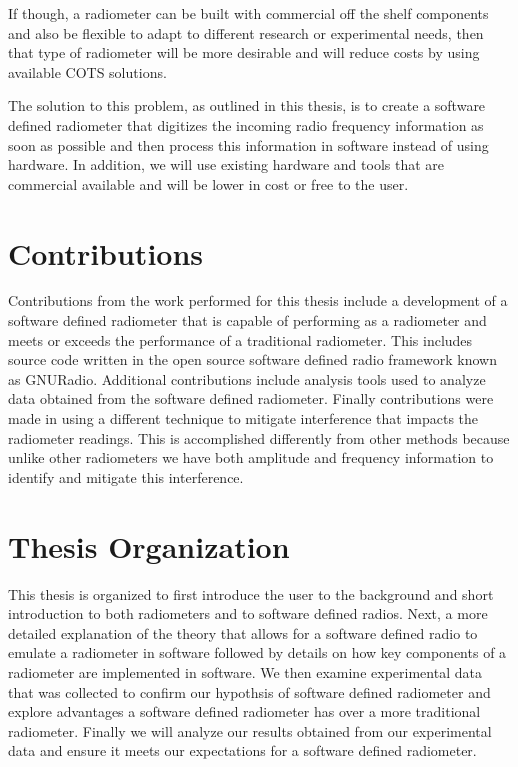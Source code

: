 If though, a radiometer can be built with commercial off the shelf components and also be flexible to adapt to different research or experimental needs, then that type of radiometer will be more desirable and will reduce costs by using available COTS solutions.  

The solution to this problem, as outlined in this thesis, is to create a software defined radiometer that digitizes the incoming radio frequency information as soon as possible and then process this information in software instead of using hardware.  In addition, we will use existing hardware and tools that are commercial available and will be lower in cost or free to the user.  

\section{Contributions}
Contributions from the work performed for this thesis include a development of a software defined radiometer that is capable of performing as a radiometer and meets or exceeds the performance of a traditional radiometer.  This includes source code written in the open source software defined radio framework known as GNURadio.  Additional contributions include analysis tools used to analyze data obtained from the software defined radiometer.  Finally contributions were made in using a different technique to mitigate interference that impacts the radiometer readings.  This is accomplished differently from other methods because unlike other radiometers we have both amplitude and frequency information to identify and mitigate this interference.

\section{Thesis Organization}
This thesis is organized to first introduce the user to the background and short introduction to both radiometers and to software defined radios.  Next, a more detailed explanation of the theory that allows for a software defined radio to emulate a radiometer in software followed by details on how key components of a radiometer are implemented in software.  We then examine experimental data that was collected to confirm our hypothsis of software defined radiometer and explore advantages a software defined radiometer has over a more traditional radiometer.  Finally we will analyze our results obtained from our experimental data and ensure it meets our expectations for a software defined radiometer.

